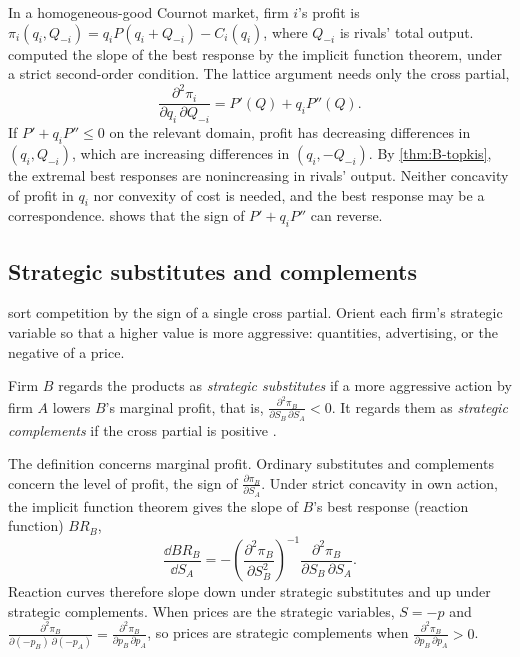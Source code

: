 \begin{example}\label{ex:B-cournot-topkis}
In a homogeneous-good Cournot market, firm $i$'s profit is $\pi_i(q_i, Q_{-i}) = q_iP(q_i + Q_{-i}) - C_i(q_i)$, where
$Q_{-i}$ is rivals' total output.  computed the slope of the best response by the implicit
function theorem, under a strict second-order condition. The lattice argument needs only the cross partial,
\[
  \frac{\partial^2\pi_i}{\partial q_i\,\partial Q_{-i}} = P'(Q) + q_iP''(Q).
\]
If $P' + q_iP'' \leq 0$ on the relevant domain, profit has decreasing differences in $(q_i, Q_{-i})$, which are
increasing differences in $(q_i, -Q_{-i})$. By \cref{thm:B-topkis}, the extremal best responses are nonincreasing in
rivals' output. Neither concavity of profit in $q_i$ nor convexity of cost is needed, and the best response may be a
correspondence.  shows that the sign of $P' + q_iP''$ can reverse.
\end{example}

\subsection{Strategic substitutes and complements}\label{sec:B-strategic}

\citet{BulowGeanakoplosKlemperer1985} sort competition by the sign of a single cross partial. Orient each
firm's strategic variable so that a higher value is more aggressive: quantities, advertising, or the negative of
a price.

\begin{definition}\label{def:B-strategic}
Firm $B$ regards the products as \emph{strategic substitutes} if a more aggressive action by firm $A$ lowers $B$'s
marginal profit, that is, $\frac{\partial^2\pi_B}{\partial S_B\,\partial S_A} < 0$. It regards them as \emph{strategic
complements} if the cross partial is positive \citep[p.~494]{BulowGeanakoplosKlemperer1985}.
\end{definition}

The definition concerns marginal profit. Ordinary substitutes and complements concern the level of profit, the
sign of $\frac{\partial\pi_B}{\partial S_A}$. Under strict concavity in own action, the implicit function theorem gives
the slope of $B$'s best response (reaction function) $BR_B$,
\[
  \frac{\dd BR_B}{\dd S_A} = -\left(\frac{\partial^2\pi_B}{\partial S_B^2}\right)^{-1}\frac{\partial^2\pi_B}{\partial S_B\,\partial S_A}\text{.}
\]
Reaction curves therefore slope down under strategic substitutes and up under strategic complements. When prices are
the strategic variables, $S = -p$ and $\frac{\partial^2\pi_B}{\partial(-p_B)\,\partial(-p_A)} = \frac{\partial^2\pi_B}{\partial p_B\,\partial p_A}$, so
prices are strategic complements when $\frac{\partial^2\pi_B}{\partial p_B\,\partial p_A} > 0$.

